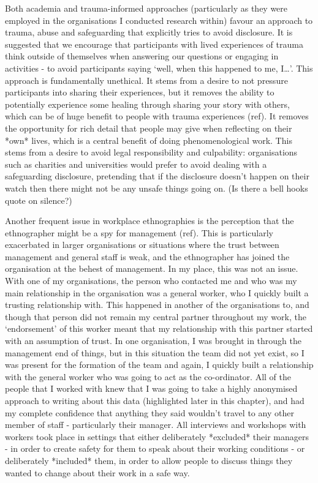 Both academia and trauma-informed approaches (particularly as they were employed in the organisations I conducted research within) favour an approach to trauma, abuse and safeguarding that explicitly tries to avoid disclosure. It is suggested that we encourage that participants with lived experiences of trauma think outside of themselves when answering our questions or engaging in activities - to avoid participants saying ‘well, when this happened to me, I…’. This approach is fundamentally unethical. It stems from a desire to not pressure participants into sharing their experiences, but it removes the ability to potentially experience some healing through sharing your story with others, which can be of huge benefit to people with trauma experiences (ref). It removes the opportunity for rich detail that people may give when reflecting on their *own* lives, which is a central benefit of doing phenomenological work. This stems from a desire to avoid legal responsibility and culpability: organisations such as charities and universities would prefer to avoid dealing with a safeguarding disclosure, pretending that if the disclosure doesn’t happen on their watch then there might not be any unsafe things going on. (Is there a bell hooks quote on silence?)

Another frequent issue in workplace ethnographies is the perception that the ethnographer might be a spy for management (ref). This is particularly exacerbated in larger organisations or situations where the trust between management and general staff is weak, and the ethnographer has joined the organisation at the behest of management. In my place, this was not an issue. With one of my organisations, the person who contacted me and who was my main relationship in the organisation was a general worker, who I quickly built a trusting relationship with. This happened in another of the organisations to, and though that person did not remain my central partner throughout my work, the ‘endorsement’ of this worker meant that my relationship with this partner started with an assumption of trust. In one organisation, I was brought in through the management end of things, but in this situation the team did not yet exist, so I was present for the formation of the team and again, I quickly built a relationship with the general worker who was going to act as the co-ordinator. All of the people that I worked with knew that I was going to take a highly anonymised approach to writing about this data (highlighted later in this chapter), and had my complete confidence that anything they said wouldn’t travel to any other member of staff - particularly their manager. All interviews and workshops with workers took place in settings that either deliberately *excluded* their managers - in order to create safety for them to speak about their working conditions - or deliberately *included* them, in order to allow people to discuss things they wanted to change about their work in a safe way.  

